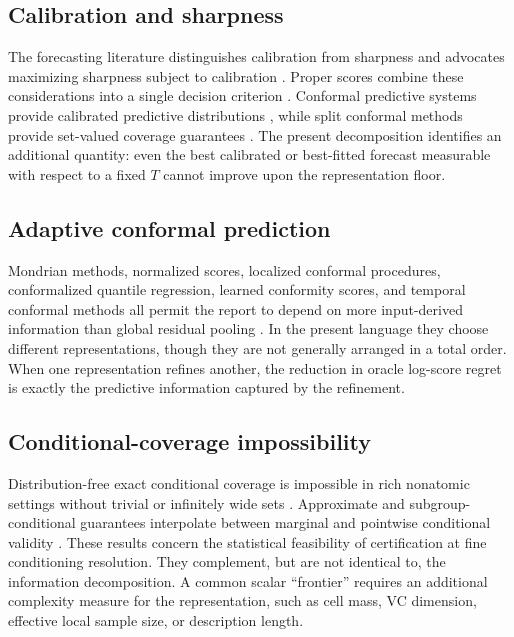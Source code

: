 \documentclass[11pt]{article}
\theoremstyle{remark}
\begin{document}
\subsection{Calibration and sharpness}

The forecasting literature distinguishes calibration from sharpness and advocates maximizing
sharpness subject to calibration \citep{gneiting2007probabilistic,dawid1984present}. Proper
scores combine these considerations into a single decision criterion
\citep{gneiting2007strictly}. Conformal predictive systems provide calibrated predictive
distributions \citep{vovk2019nonparametric}, while split conformal methods provide set-valued
coverage guarantees \citep{vovk2005algorithmic,lei2018distribution,angelopoulos2023gentle}. The
present decomposition identifies an additional quantity: even the best calibrated or best-fitted
forecast measurable with respect to a fixed $T$ cannot improve upon the representation floor.

\subsection{Adaptive conformal prediction}

Mondrian methods, normalized scores, localized conformal procedures, conformalized quantile
regression, learned conformity scores, and temporal conformal methods all permit the report to
depend on more input-derived information than global residual pooling
\citep{bostrom2021mondrian,lei2018distribution,romano2019conformalized,chernozhukov2021distributional,gibbs2021adaptive,auer2023hopcpt}.
In the present language they choose different representations, though they are not generally
arranged in a total order. When one representation refines another, the reduction in oracle
log-score regret is exactly the predictive information captured by the refinement.

\subsection{Conditional-coverage impossibility}

Distribution-free exact conditional coverage is impossible in rich nonatomic settings without
trivial or infinitely wide sets \citep{lei2014distribution,barber2021limits}. Approximate and
subgroup-conditional guarantees interpolate between marginal and pointwise conditional validity
\citep{vovk2012conditional,gibbs2025conditional,braun2025conditional}. These results concern the
statistical feasibility of certification at fine conditioning resolution. They complement, but
are not identical to, the information decomposition. A common scalar ``frontier'' requires an
additional complexity measure for the representation, such as cell mass, VC dimension, effective
local sample size, or description length.
\end{document}

